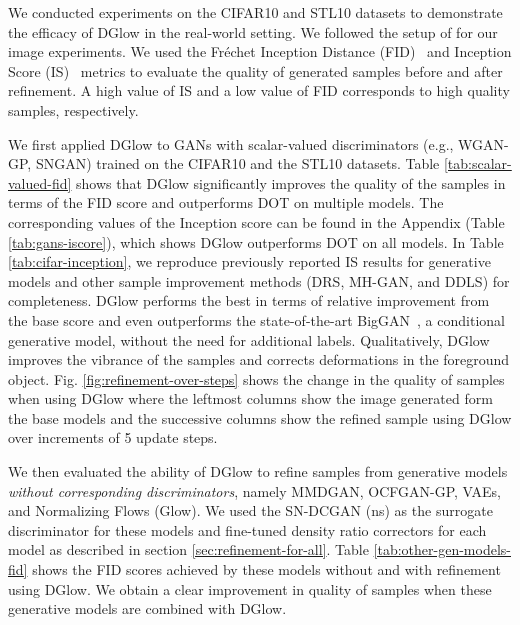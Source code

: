 \documentclass{article} \usepackage{iclr2021_conference,times}
\newcommand{\ourmethod}{\textsc{DG}low}
\begin{document}
We conducted experiments on the CIFAR10 and STL10 datasets to demonstrate the efficacy of \ourmethod{} in the real-world setting. We followed the setup of \citet{tanaka2019discriminator} for our image experiments. We used the Fr\'echet Inception Distance (FID)~\citep{heusel2017gans} and Inception Score (IS)~\citep{salimans2016improved} metrics to evaluate the quality of generated samples before and after refinement. 
A high value of IS and a low value of FID corresponds to high quality samples, respectively. 

We first applied \ourmethod{} to GANs with scalar-valued discriminators (e.g., WGAN-GP, SNGAN) trained on the CIFAR10 and the STL10 datasets. Table \ref{tab:scalar-valued-fid} shows that \ourmethod{} significantly improves the quality of the samples in terms of the FID score and outperforms DOT on multiple models. The corresponding values of the Inception score can be found in the Appendix (Table \ref{tab:gans-iscore}), which shows \ourmethod{} outperforms DOT on all models. In Table \ref{tab:cifar-inception}, we reproduce previously reported IS results for generative models and other sample improvement methods (DRS, MH-GAN, and DDLS) for completeness. \ourmethod{} performs the best in terms of relative improvement from the base score and even outperforms the state-of-the-art BigGAN~\citep{brock2018large}, a conditional generative model, without the need for additional labels. Qualitatively, \ourmethod{} improves the vibrance of the samples and corrects deformations in the foreground object. Fig. \ref{fig:refinement-over-steps} shows the change in the quality of samples when using \ourmethod{} where the leftmost columns show the image generated form the base models and the successive columns show the refined sample using \ourmethod{} over increments of 5 update steps. 

We then evaluated the ability of \ourmethod{} to refine samples from generative models \emph{without corresponding discriminators}, namely MMDGAN, OCFGAN-GP, VAEs, and Normalizing Flows (Glow). We used the SN-DCGAN (ns) as the surrogate discriminator  for these models and fine-tuned density ratio correctors  for each model as described in section \ref{sec:refinement-for-all}. Table \ref{tab:other-gen-models-fid} shows the FID scores achieved by these models without and with refinement using \ourmethod{}. We obtain a clear improvement in quality of samples when these generative models are combined with \ourmethod{}. 
\end{document}
